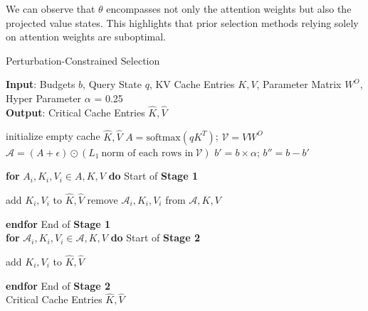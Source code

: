  We can observe that $\theta$ encompasses not only the attention weights but also the projected value states. This highlights that prior selection methods relying solely on attention weights are suboptimal.
\begin{algorithm}[tb]
	\small
	\caption{Perturbation-Constrained Selection }
	\label{alg:selection}
	\textbf{Input}: Budgets $b$, Query State $q$, KV Cache Entries $K,V$, Parameter Matrix $W^O$, Hyper Parameter $\alpha$ = 0.25\\
	\textbf{Output}: Critical Cache Entries $\hat{K},\hat{V}$
	\begin{algorithmic}[1] %
		\STATE initialize  empty cache  $\hat{K},\hat{V}$ %
		\STATE $A = \text{softmax}(qK^T)$; $\boldsymbol{\mathcal{V}} = VW^O$
		\STATE $\boldsymbol{\mathcal{A}} = (A + \epsilon) \odot ( L_1 \: \text{norm of each rows in}\: \boldsymbol{\mathcal{V}})$
		\STATE $b' = b \times \alpha$;  $b'' = b - b'$

        \STATE \textbf{for} {$A_i,K_i,V_i \in A,K,V$} \textbf{do} \hfill {Start of \textbf{Stage 1}}\\
        \begin{ALC@for}



		\STATE add $K_i, V_i$ to $\hat{K},\hat{V}$
		\STATE remove $\boldsymbol{\mathcal{A}}_i, K_i, V_i$ from $\boldsymbol{\mathcal{A}},K,V$
		\ENDIF


        \end{ALC@for}
        \STATE \textbf{endfor} \hfill {End of \textbf{Stage 1}}\\


        \STATE \textbf{for} {$ \boldsymbol{\mathcal{A}}_i,K_i,V_i \in \boldsymbol{\mathcal{A}},K,V$} \textbf{do} \hfill {Start of \textbf{Stage 2}}\\
        \begin{ALC@for}

		\STATE add $K_i, V_i$ to $\hat{K},\hat{V}$
		\ENDIF

        \end{ALC@for}
        \STATE \textbf{endfor} \hfill {End of \textbf{Stage 2}}\\
		\RETURN  Critical Cache Entries $\hat{K},\hat{V}$
	\end{algorithmic}
\end{algorithm}

